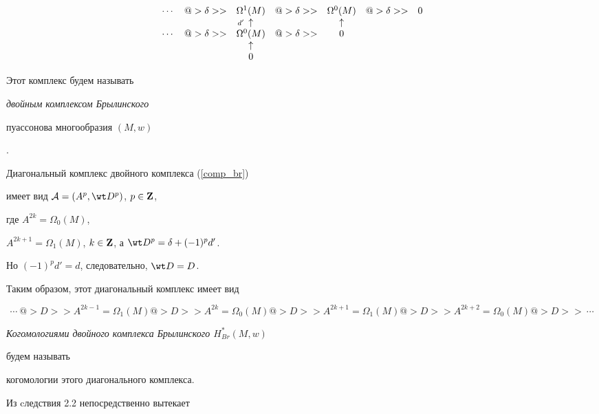 \begin{equation}
\begin{matrix}
%


\dotsb & @>{\delta}>> & \Omega^{1}(M) & @>{\delta}>> &


\Omega^{0}(M) &  @>{\delta}>> & 0 & & \\


%


& & \UP & & \uparrow & & & & \\


%


\dotsb & @>{\delta}>> & \Omega^{0}(M) & @>{\delta}>> & 0 & & & & \\


%


& & \uparrow & & & & & & \\


%


& & 0 & & & & & & \\


\end{matrix}


\end{equation}


Этот комплекс будем называть {\it двойным комплексом Брылинского


пуассонова многообразия $(M,w)$}.


Диагональный комплекс двойного комплекса (\ref{comp_br})


имеет вид ${\cal A}=(A^p, \wt D^p)$, $p\in {\bold Z}$,


где $A^{2k}=\Omega_0(M)$,


$A^{2k+1}=\Omega_1(M)$, $k\in {\bold Z}$, а $\wt D^p=\delta+(-1)^p d'$.


Но $(-1)^p d'=d$, следовательно, $\wt D=D$.


Таким образом, этот диагональный комплекс имеет вид


$$


\dotsb \ @>{D}>> A^{2k-1}=\Omega_1(M)


@>{D}>> A^{2k}=\Omega_0(M)


@>{D}>> A^{2k+1}=\Omega_1(M)


@>{D}>> A^{2k+2}=\Omega_0(M) @>{D}>> \ \dotsb


$$


{\it Когомологиями двойного комплекса Брылинского $H^*_{Br}(M,w)$}


будем называть


когомологии этого диагонального комплекса.





Из cледствия 2.2 непосредственно вытекает





